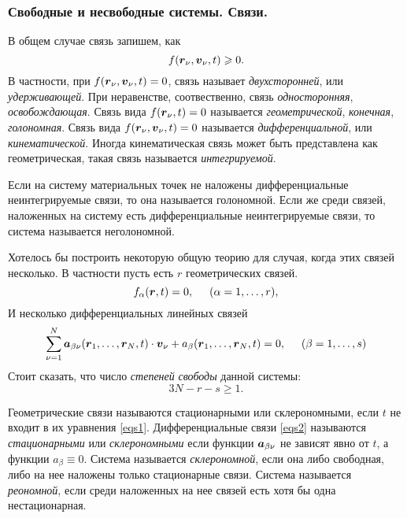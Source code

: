 \subsubsection*{Свободные и несвободные системы. Связи.}

В общем случае связь запишем, как
$$
    f(\mbox{\boldmath $r$}_\nu, \mbox{\boldmath $v$}_\nu, t) \geqslant 0.
$$
В частности, при $f(\mbox{\boldmath $r$}_\nu, \mbox{\boldmath $v$}_\nu, t) = 0$, связь называет \textit{двухсторонней}, или \textit{удерживающей}. При неравенстве, соотвественно, связь \textit{односторонняя}, \textit{освобождающая}.
Связь вида $f(\mbox{\boldmath $r$}_\nu, t) = 0$ называется \textit{геометрической}, \textit{конечная}, \textit{голономная}. Связь вида $f(\mbox{\boldmath $r$}_\nu, \mbox{\boldmath $v$}_\nu, t) = 0$ называется \textit{дифференциальной}, или \textit{кинематической}. Иногда кинематическая связь может быть представлена как геометрическая, такая связь называется \textit{интегрируемой}. 

\begin{to_def} 
     Если на систему материальных точек не наложены дифференциальные неинтегрируемые связи, то она называется голономной. Если же среди связей, наложенных на систему есть дифференциальные неинтегрируемые связи, то система называется неголономной.
\end{to_def}

Хотелось бы построить некоторую общую теорию для случая, когда этих связей несколько. 
В частности пусть есть $r$ геометрических связей.
\begin{equation}
\label{eqs1}
    f_\alpha (\mbox{\boldmath $r$}, t) = 0, \hspace{0.5cm} (\alpha = 1, \ldots, r),
\end{equation}
И несколько дифференциальных линейных связей
\begin{equation}
\label{eqs2}
    \sum_{\nu=1}^N \mbox{\boldmath $a$}_{\beta \nu} (\mbox{\boldmath $r$}_1, \ldots, \mbox{\boldmath $r$}_N, t) \cdot \mbox{\boldmath $v$}_\nu + a_\beta  (\mbox{\boldmath $r$}_1, \ldots, \mbox{\boldmath $r$}_N, t) = 0,
    \hspace{0.5cm} (\beta = 1, \ldots, s)
\end{equation}
Стоит сказать, что число \textit{степеней} \textit{свободы} данной системы:
$$
    3N - r - s \geq 1.
$$

\begin{to_def} 
     Геометрические связи называются стационарными или склерономными, если $t$ не входит в их уравнения \eqref{eqs1}. Дифференциальные связи \eqref{eqs2} называются \textit{стационарными} или \textit{склерономными} если функции $\mbox{\boldmath $a$}_{\beta\nu}$ не зависят явно от $t$, а функции $a_\beta \equiv 0$. Система называется \textit{склерономной}, если она либо свободная, либо на нее наложены только стационарные связи. Система называется \textit{реономной}, если среди наложенных на нее связей есть хотя бы одна нестационарная.
\end{to_def}

